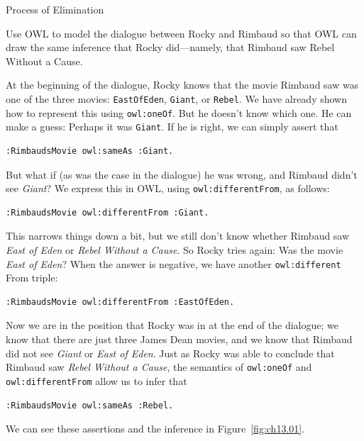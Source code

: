 \begin{challenge}{Process of Elimination}

Use OWL to model the dialogue between Rocky and Rimbaud so that OWL can
draw the same inference that Rocky did---namely, that Rimbaud saw Rebel
Without a Cause.

\solution

At the beginning of the dialogue, Rocky knows that the movie Rimbaud saw
was one of the three movies: \texttt{EastOfEden}, \texttt{Giant}, or \texttt{Rebel}. We have
already shown how to represent this using \texttt{owl:oneOf}. But he doesn't know
which one. He can make a guess: Perhaps it was \texttt{Giant}. If he is right, we
can simply assert that

\begin{lstlisting}
:RimbaudsMovie owl:sameAs :Giant.
\end{lstlisting}

But what if (as was the case in the dialogue) he was wrong, and Rimbaud
didn't see \emph{Giant}? We express this in OWL, using \texttt{owl:differentFrom}, as
follows:

\begin{lstlisting}
:RimbaudsMovie owl:differentFrom :Giant.
\end{lstlisting}

This narrows things down a bit, but we still don't know whether Rimbaud
saw \emph{East of Eden} or \emph{Rebel Without a Cause}. So Rocky tries again: Was the
movie \emph{East of Eden}? When the answer is negative, we have another
\texttt{owl:different} From triple:

\begin{lstlisting}
:RimbaudsMovie owl:differentFrom :EastOfEden.
\end{lstlisting}

Now we are in the position that Rocky was in at the end of the dialogue;
we know that there are just three James Dean movies, and we know that
Rimbaud did not see \emph{Giant} or \emph{East of Eden}. Just as Rocky was able to
conclude that Rimbaud saw \emph{Rebel Without a Cause}, the semantics of
\texttt{owl:oneOf} and \texttt{owl:differentFrom} allow us to infer that

\begin{lstlisting}
:RimbaudsMovie owl:sameAs :Rebel.
\end{lstlisting}

We can see these assertions and the inference in Figure~\ref{fig:ch13.01}.
\end{challenge}

